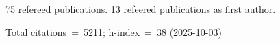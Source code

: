 75 refereed publications. 13 refeered publications as first author.

Total citations~=~5211; h-index~=~38 (2025-10-03)